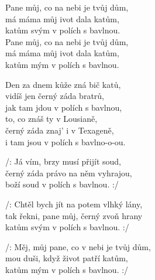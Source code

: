 
\ve{}
Pane můj, co na nebi je tvůj dům,\\
má máma můj ivot dala katům,\\
katům svým v polích s bavlnou.\\
Pane můj, co na nebi je tvůj dům,\\
má máma můj ivot dala katům,\\
katům mým v polích s bavlnou. 

\cho{}
Den za dnem kůže zná bič katů,\\
vidíš jen černý záda bratrů,\\
jak tam jdou v polích s bavlnou,\\
to, co znáš ty v Lousianě,\\
černý záda znaj' i v Texageně,\\
i tam jsou v polích s bavlno-o-ou. 

\ve{}
/: Já vím, brzy musí přijít soud,\\
černý záda právo na něm vyhrajou,\\
boží soud v polích s bavlnou. :/

\cho{}

\ve{}
/: Chtěl bych jít na potem vlhký lány,\\
tak řekni, pane můj, černý zvoň hrany\\
katům svým v polích s bavlnou. :/

\cho{} 

\ve{}
/: Měj, můj pane, co v nebi je tvůj dům,\\
mou duši, když život patří katům,\\
katům mým v polích s bavlnou. :/

\esong{}
